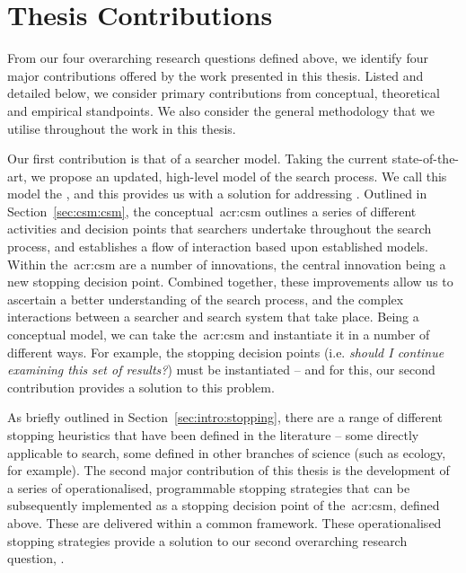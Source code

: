 \vspace*{-5mm}
\section{Thesis Contributions}\label{sec:intro:contribs}
From our four overarching research questions defined above, we identify four major contributions offered by the work presented in this thesis. Listed and detailed below, we consider primary contributions from conceptual, theoretical and empirical standpoints. We also consider the general methodology that we utilise throughout the work in this thesis.

\noindent
{}
Our first contribution is that of a searcher model. Taking the current state-of-the-art, we propose an updated, high-level model of the search process. We call this model the , and this provides us with a solution for addressing . Outlined in Section~\ref{sec:csm:csm}, the conceptual~\gls{acr:csm} outlines a series of different activities and decision points that searchers undertake throughout the search process, and establishes a flow of interaction based upon established models. Within the~\gls{acr:csm} are a number of innovations, the central innovation being a new stopping decision point. Combined together, these improvements allow us to ascertain a better understanding of the search process, and the complex interactions between a searcher and search system that take place. Being a conceptual model, we can take the~\gls{acr:csm} and instantiate it in a number of different ways. For example, the stopping decision points (i.e. \emph{should I continue examining this set of results?}) must be instantiated -- and for this, our second contribution provides a solution to this problem.

\noindent
{}
As briefly outlined in Section~\ref{sec:intro:stopping}, there are a range of different stopping heuristics that have been defined in the literature -- some directly applicable to search, some defined in other branches of science (such as ecology, for example). The second major contribution of this thesis is the development of a series of operationalised, programmable stopping strategies that can be subsequently implemented as a stopping decision point of the~\gls{acr:csm}, defined above. These are delivered within a common framework. These operationalised stopping strategies provide a solution to our second overarching research question, .

